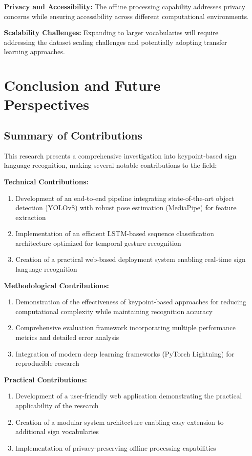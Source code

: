\documentclass[11pt, a4paper]{article}
\begin{document}
\textbf{Privacy and Accessibility:}
The offline processing capability addresses privacy concerns while ensuring accessibility across different computational environments.

\textbf{Scalability Challenges:}
Expanding to larger vocabularies will require addressing the dataset scaling challenges and potentially adopting transfer learning approaches.

\section{Conclusion and Future Perspectives}

\subsection{Summary of Contributions}

This research presents a comprehensive investigation into keypoint-based sign language recognition, making several notable contributions to the field:

\textbf{Technical Contributions:}
\begin{enumerate}
    \item Development of an end-to-end pipeline integrating state-of-the-art object detection (YOLOv8) with robust pose estimation (MediaPipe) for feature extraction
    \item Implementation of an efficient LSTM-based sequence classification architecture optimized for temporal gesture recognition
    \item Creation of a practical web-based deployment system enabling real-time sign language recognition
\end{enumerate}

\textbf{Methodological Contributions:}
\begin{enumerate}
    \item Demonstration of the effectiveness of keypoint-based approaches for reducing computational complexity while maintaining recognition accuracy
    \item Comprehensive evaluation framework incorporating multiple performance metrics and detailed error analysis
    \item Integration of modern deep learning frameworks (PyTorch Lightning) for reproducible research
\end{enumerate}

\textbf{Practical Contributions:}
\begin{enumerate}
    \item Development of a user-friendly web application demonstrating the practical applicability of the research
    \item Creation of a modular system architecture enabling easy extension to additional sign vocabularies
    \item Implementation of privacy-preserving offline processing capabilities
\end{enumerate}
\end{document}
